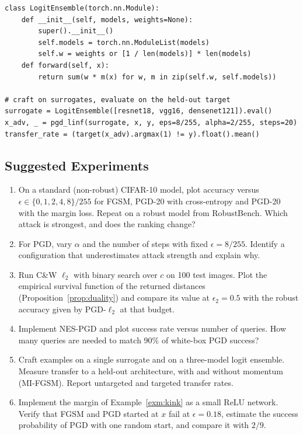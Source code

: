 \documentclass[10pt,a4paper]{extarticle}
\theoremstyle{definition}
\begin{document}
\begin{lstlisting}
class LogitEnsemble(torch.nn.Module):
    def __init__(self, models, weights=None):
        super().__init__()
        self.models = torch.nn.ModuleList(models)
        self.w = weights or [1 / len(models)] * len(models)
    def forward(self, x):
        return sum(w * m(x) for w, m in zip(self.w, self.models))

# craft on surrogates, evaluate on the held-out target
surrogate = LogitEnsemble([resnet18, vgg16, densenet121]).eval()
x_adv, _ = pgd_linf(surrogate, x, y, eps=8/255, alpha=2/255, steps=20)
transfer_rate = (target(x_adv).argmax(1) != y).float().mean()
\end{lstlisting}

\subsection{Suggested Experiments}

\begin{enumerate}[label=\textbf{\arabic*.}]
  \item On a standard (non-robust) CIFAR-10 model, plot accuracy versus \(\epsilon\in\{0,1,2,4,8\}/255\) for FGSM, PGD-20 with cross-entropy and PGD-20 with the margin loss. Repeat on a robust model from RobustBench. Which attack is strongest, and does the ranking change?
  \item For PGD, vary \(\alpha\) and the number of steps with fixed \(\epsilon=8/255\). Identify a configuration that underestimates attack strength and explain why.
  \item Run C\&W \(\ell_2\) with binary search over \(c\) on 100 test images. Plot the empirical survival function of the returned distances (Proposition~\ref{prop:duality}) and compare its value at \(\epsilon_2=0.5\) with the robust accuracy given by PGD-\(\ell_2\) at that budget.
  \item Implement NES-PGD and plot success rate versus number of queries. How many queries are needed to match 90\% of white-box PGD success?
  \item Craft examples on a single surrogate and on a three-model logit ensemble. Measure transfer to a held-out architecture, with and without momentum (MI-FGSM). Report untargeted and targeted transfer rates.
  \item Implement the margin of Example~\ref{exm:kink} as a small ReLU network. Verify that FGSM and PGD started at \(x\) fail at \(\epsilon=0.18\), estimate the success probability of PGD with one random start, and compare it with \(2/9\).
\end{enumerate}
\end{document}
